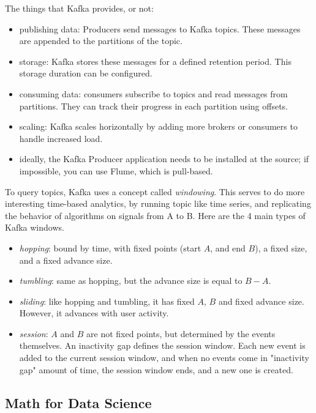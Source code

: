 \documentclass{article}
\begin{document}
\begin{itemize}
	The things that Kafka provides, or not:
	\begin{itemize}
		\item publishing data: Producers send messages to Kafka topics. These messages are appended to the partitions of the topic.
		\item storage: Kafka stores these messages for a defined retention period. This storage duration can be configured.
		\item consuming data: consumers subscribe to topics and read messages from partitions. They can track their progress in each partition using offsets.
		\item scaling: Kafka scales horizontally by adding more brokers or consumers to handle increased load.
		\item ideally, the Kafka Producer application needs to be installed at the source; if impossible, you can use Flume, which is pull-based.
	\end{itemize}

	To query topics, Kafka uses a concept called \textit{windowing}. This serves to do more interesting time-based analytics, by running topic like time series, and replicating the behavior of algorithms on signals from A to B. Here are the 4 main types of Kafka windows.
	\begin{itemize}
		\item \textit{hopping}: bound by time, with fixed points (start $A$, and end $B$), a fixed size, and a fixed advance size.
		\item \textit{tumbling}: same as hopping, but the advance size is equal to $B - A$.
		\item \textit{sliding}: like hopping and tumbling, it has fixed $A$, $B$ and fixed advance size. However, it advances with user activity.
		\item \textit{session}: $A$ and $B$ are not fixed points, but determined by the events themselves. An inactivity gap defines the session window. Each new event is added to the current session window, and when no events come in "inactivity gap" amount of time, the session window ends, and a new one is created.
	\end{itemize}

\end{itemize}




\subsection*{Math for Data Science}
\end{document}

